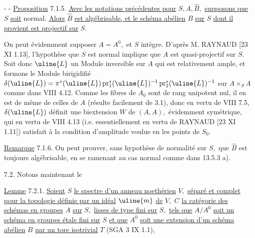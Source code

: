 -  -
\uline{Proposition} 7.1.5. \uline{Avec les notations précédentes pour} \(S,A,\hat B,\) \uline{supposons que} \(S\) \uline{soit} normal. \uline{Alors} \(\hat B\) \uline{est algébrisable, et le schéma abélien} \(B\) \uline{sur} \(S\) \uline{dont il provient est projectif sur} \(S.\)

On peut évidemment supposer \(A=A^0,\) et \(S\) intègre. D'après M. RAYNAUD [23 XI 1.13], l'hypothèse que \(S\) est normal implique que \(A\) est quasi-projectif sur \(S.\) Soit donc \(\uline{L}\) un Module inversible sur \(A\) qui est relativement ample, et formons le Module birigidifié
\(\delta(\uline{L})=\pi^*(\uline{L})\operatorname{pr}_1^*(\uline{L})^{-1}\operatorname{pr}_2^*(\uline{L})^{-1}\)
sur \(A\times_S A\) comme dans VIII 4.12. Comme les fibres de \(A_0\) sont de rang unipotent nul, il en est de même de celles de \(A\) (résulte facilement de 3.1), donc en vertu de VIII 7.5, \(\delta(\uline{L})\) définit une biextension \(W\) de \((A,A),\) évidemment symétrique, qui en vertu de VIII 4.13 (i.e. essentiellement en vertu de RAYNAUD [23 XI 1.11]) satisfait à la condition d'amplitude voulue en les points de \(S_0.\)

\uline{Remarque} 7.1.6. On peut prouver, sans hypothèse de normalité sur \(S,\) que \(\hat B\) est toujours algébrisable, en se ramenant au cas normal comme dans 13.5.3 a).

7.2. Notons maintenant le

\uline{Lemme} 7.2.1. \uline{Soient} \(S\) \uline{le spectre d'un anneau noethérien} \(V,\) \uline{séparé et complet pour la topologie définie par un idéal} \(\uline{m}\) \uline{de} \(V,\) \(C\) \uline{la catégorie des schémas en groupes} \(A\) \uline{sur} \(S,\) \uline{lisses de type fini sur} \(S,\) \uline{tels que} \(A/A^0\) \uline{soit un schéma en groupes étale fini sur} \(S\) \uline{et que} \(A^0\) \uline{soit une extension d'un schéma abélien} \(B\) \uline{par un tore isotrivial} \(T\) (SGA 3 IX 1.1),
